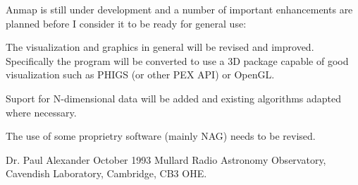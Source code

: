 Anmap is still under development and a number of important
enhancements are planned before I consider it to be 
ready for general use:
\begin{apars}
\item The visualization and graphics in general will
be revised and improved.  Specifically the program will
be converted to use a 3D package capable of good visualization
such as PHIGS (or other PEX API) or OpenGL.
\item Suport for N-dimensional data will be added and existing
algorithms adapted where necessary.
\item The use of some proprietry software (mainly NAG) needs
to be revised.
\end{apars}
\vspace{1.5cm}
Dr. Paul Alexander \hfill October 1993
\newline
Mullard Radio Astronomy Observatory,
\newline
Cavendish Laboratory, Cambridge, CB3 OHE.



